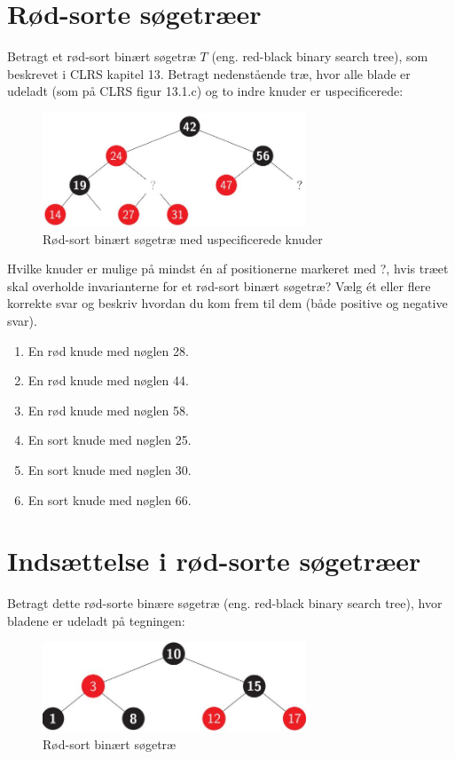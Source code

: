 \documentclass{article}
\theoremstyle{definition}
\begin{document}
\section{Rød-sorte søgetræer}

Betragt et rød-sort binært søgetræ $T$ (eng. red-black binary search tree), som beskrevet i CLRS kapitel 13. Betragt nedenstående træ, hvor alle blade er udeladt (som på CLRS figur 13.1.c) og to indre knuder er uspecificerede:

\begin{figure}[H]
    \centering
    \includegraphics[width=0.7\textwidth]{_page_1_Figure_5.jpeg}
    \caption{Rød-sort binært søgetræ med uspecificerede knuder}
\end{figure}

Hvilke knuder er mulige på mindst én af positionerne markeret med ?, hvis træet skal overholde invarianterne for et rød-sort binært søgetræ? Vælg ét eller flere korrekte svar og beskriv hvordan du kom frem til dem (både positive og negative svar).

\begin{enumerate}
\item En rød knude med nøglen 28.
\item En rød knude med nøglen 44.
\item En rød knude med nøglen 58.
\item En sort knude med nøglen 25.
\item En sort knude med nøglen 30.
\item En sort knude med nøglen 66.
\end{enumerate}

\section{Indsættelse i rød-sorte søgetræer}

Betragt dette rød-sorte binære søgetræ (eng. red-black binary search tree), hvor bladene er udeladt på tegningen:

\begin{figure}[H]
    \centering
    \includegraphics[width=0.7\textwidth]{_page_2_Figure_0.jpeg}
    \caption{Rød-sort binært søgetræ}
\end{figure}
\end{document}
